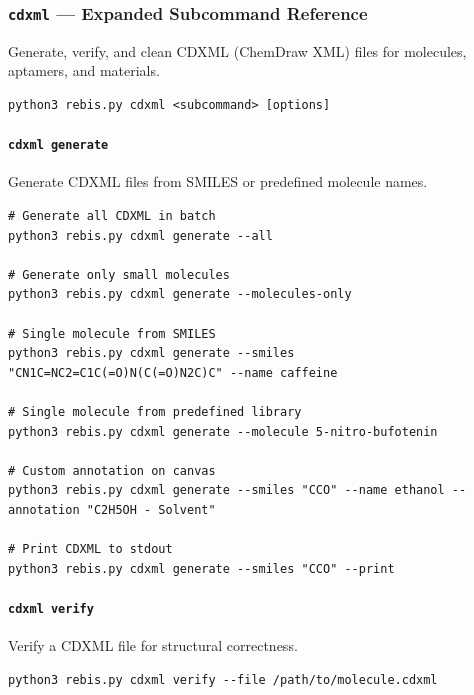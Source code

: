 \hypertarget{cdxml-expanded-subcommand-reference}{%
\subsubsection{\texorpdfstring{\texttt{cdxml} --- Expanded Subcommand
Reference}{cdxml --- Expanded Subcommand Reference}}\label{cdxml-expanded-subcommand-reference}}

Generate, verify, and clean CDXML (ChemDraw XML) files for molecules,
aptamers, and materials.

\begin{verbatim}
python3 rebis.py cdxml <subcommand> [options]
\end{verbatim}

\hypertarget{cdxml-generate}{%
\paragraph{\texorpdfstring{\texttt{cdxml\ generate}}{cdxml generate}}\label{cdxml-generate}}

Generate CDXML files from SMILES or predefined molecule names.

\begin{verbatim}
# Generate all CDXML in batch
python3 rebis.py cdxml generate --all

# Generate only small molecules
python3 rebis.py cdxml generate --molecules-only

# Single molecule from SMILES
python3 rebis.py cdxml generate --smiles "CN1C=NC2=C1C(=O)N(C(=O)N2C)C" --name caffeine

# Single molecule from predefined library
python3 rebis.py cdxml generate --molecule 5-nitro-bufotenin

# Custom annotation on canvas
python3 rebis.py cdxml generate --smiles "CCO" --name ethanol --annotation "C2H5OH - Solvent"

# Print CDXML to stdout
python3 rebis.py cdxml generate --smiles "CCO" --print
\end{verbatim}

\hypertarget{cdxml-verify}{%
\paragraph{\texorpdfstring{\texttt{cdxml\ verify}}{cdxml verify}}\label{cdxml-verify}}

Verify a CDXML file for structural correctness.

\begin{verbatim}
python3 rebis.py cdxml verify --file /path/to/molecule.cdxml
\end{verbatim}

